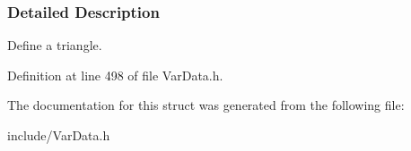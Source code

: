 \subsubsection{Detailed Description}
Define a triangle. 

Definition at line 498 of file Var\+Data.\+h.



The documentation for this struct was generated from the following file\+:\begin{DoxyCompactItemize}
\item 
include/Var\+Data.\+h\end{DoxyCompactItemize}

